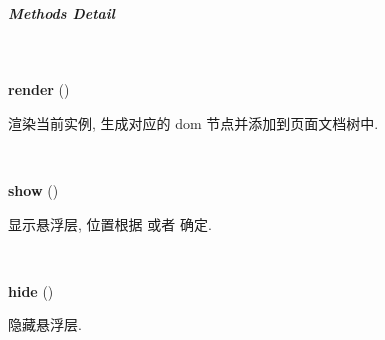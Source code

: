 \documentclass[letterpaper,10pt,english]{sphinxmanual}
\begin{document}
\subparagraph{Methods Detail}
\label{api/component/overlay/overlay:methods-detail}

\begin{fulllineitems}
\label{api/component/overlay/overlay:Overlay.render}~
\begin{DUlineblock}{0em}
\item[] \textbf{render} ()
\item[] 渲染当前实例, 生成对应的 dom 节点并添加到页面文档树中.
\end{DUlineblock}

\end{fulllineitems}



\begin{fulllineitems}
\label{api/component/overlay/overlay:Overlay.show}~
\begin{DUlineblock}{0em}
\item[] \textbf{show} ()
\item[] 显示悬浮层, 位置根据 {\hyperref[api/component/overlay/overlay:Overlay.align]{}} 或者 {\hyperref[api/component/overlay/overlay:Overlay.xy]{}} 确定.
\end{DUlineblock}

\end{fulllineitems}



\begin{fulllineitems}
\label{api/component/overlay/overlay:Overlay.hide}~
\begin{DUlineblock}{0em}
\item[] \textbf{hide} ()
\item[] 隐藏悬浮层.
\end{DUlineblock}

\end{fulllineitems}


\end{document}
